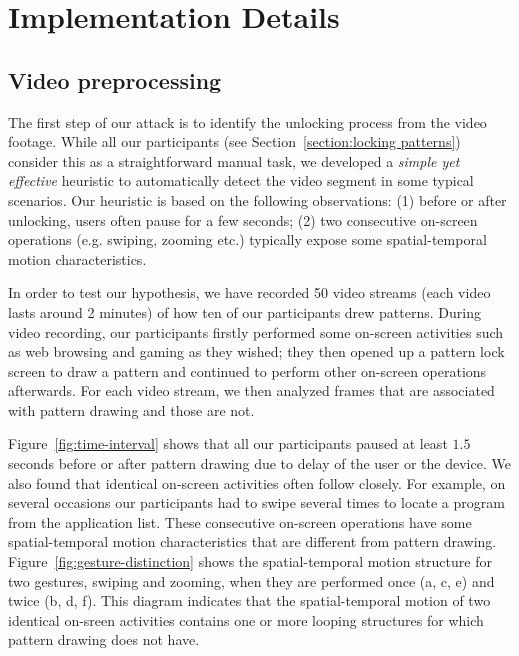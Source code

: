 \section{Implementation Details}

\subsection{Video preprocessing \label{sec:identify}}
\label{section:recognition}
The first step of our attack is to identify the unlocking process from the
video footage. While all our
participants (see Section~\ref{section:locking patterns}) consider this as a straightforward manual task, we developed a \emph{simple yet effective} heuristic to automatically detect the video segment in some typical scenarios. Our heuristic is based on the following observations: (1) before or after
unlocking, users often pause for a few seconds; (2) two consecutive on-screen operations (e.g. swiping, zooming etc.) typically expose some spatial-temporal motion characteristics.

In order to test our hypothesis, we have recorded 50 video streams (each
video lasts around 2 minutes) of how ten of our participants drew
patterns. During video recording, our participants firstly performed
some on-screen activities such as web browsing and gaming as they wished;
they then opened up a pattern lock screen to draw a pattern and
continued to perform other on-screen operations afterwards.
For each video stream, we then analyzed frames that are associated with pattern drawing and those are not.


Figure~\ref{fig:time-interval} shows that all our participants paused at least $1.5$ seconds before or after pattern drawing due to delay of the user or the device.
We also found that identical on-screen activities often follow closely. For example, on several occasions our participants had to swipe several times  to locate a program from the application list.
These consecutive on-screen operations have some spatial-temporal motion characteristics that are different from pattern drawing.
Figure~\ref{fig:gesture-distinction} shows the spatial-temporal motion structure for  two gestures, swiping and zooming, when they are performed once (a, c, e) and twice (b, d, f).
This diagram indicates that the spatial-temporal motion of two identical on-sreen activities contains one or more looping structures for which pattern drawing does not have.



